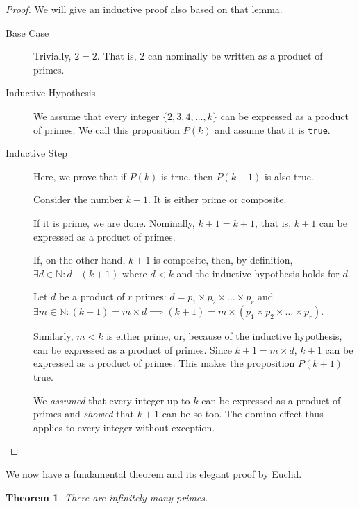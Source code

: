 \documentclass[english,notitlepage,smartquotes]{hgbreport}
\theoremstyle{definition}
\theoremstyle{remark}
\theoremstyle{plain}
\newtheorem{theorem}{Theorem}[chapter]
\begin{document}
\begin{proof}
We will give an inductive proof also based on that lemma.
\begin{description}
\item [Base Case] Trivially, $2=2$. That is, 2 can nominally be written as a product of primes.
\item [Inductive Hypothesis] We assume that every integer $\{2,3,4,\dots,k\}$ can be expressed as a product of primes. We call this proposition $P(k)$ and assume that it is \texttt{true}.
\item [Inductive Step] Here, we prove that if $P(k)$ is true, then $P(k+1)$ is also true.

Consider the number $k+1$. It is either prime or composite.

If it is prime, we are done. Nominally, $k+1=k+1$, that is, $k+1$ can be expressed as a product of primes.

If, on the other hand, $k+1$ is composite, then, by definition, $\exists d\in\mathbb{N}:d\mid(k+1)$ where $d<k$ and the inductive hypothesis holds for $d$. 

Let $d$ be a product of $r$ primes: $d=p_1\times p_2\times\dots\times p_r$ and $\exists m\in\mathbb{N}:(k+1)=m\times d\implies (k+1)=m\times(p_1\times p_2\times\dots\times p_r)$.

Similarly, $m<k$ is either prime, or, because of the inductive hypothesis, can be expressed as a product of primes. Since $k+1=m\times d$, $k+1$ can be expressed as a product of primes. This makes the proposition $P(k+1)$ true. 

We \emph{assumed} that every integer up to $k$ can be expressed as a product of primes and \emph{showed} that $k+1$ can be so too. The domino effect thus applies to every integer without exception. 
\end{description}

\end{proof}

We now have a fundamental theorem and its elegant proof by Euclid.

\begin{theorem}
\label{thm:prime-infinitude}
There are infinitely many primes.
\end{theorem}
\end{document}

